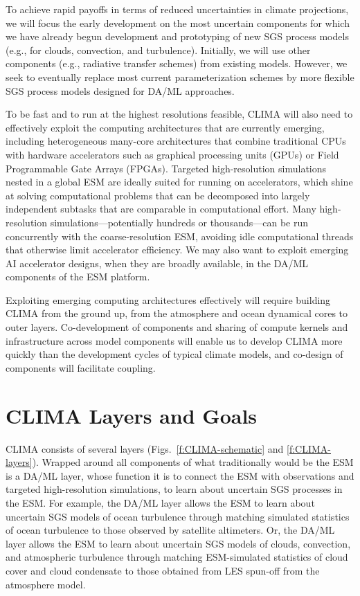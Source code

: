 \documentclass{article}
\begin{document}
To achieve rapid payoffs in terms of reduced uncertainties in climate projections, we will focus the early development on the most uncertain components for which we have already begun development and prototyping of new SGS process models (e.g., for clouds, convection, and turbulence). Initially, we will use other components (e.g., radiative transfer schemes) from existing models. However, we seek to eventually replace most current parameterization schemes by more flexible SGS process models designed for DA/ML approaches. 

To be fast and to run at the highest resolutions feasible, CLIMA will also need to effectively exploit the computing architectures that are currently emerging, including heterogeneous many-core architectures that combine traditional CPUs with hardware accelerators such as graphical processing units (GPUs) or Field Programmable Gate Arrays (FPGAs). Targeted high-resolution simulations nested in a global ESM are ideally suited for running on accelerators, which shine at solving computational problems that can be decomposed into largely independent subtasks that are comparable in computational effort. Many high-resolution simulations---potentially hundreds or thousands---can be run concurrently with the coarse-resolution ESM, avoiding idle computational threads that otherwise limit accelerator efficiency. We may also want to exploit emerging AI accelerator designs, when they are broadly available, in the DA/ML components of the ESM platform. 

Exploiting emerging computing architectures effectively will require building CLIMA from the ground up, from the atmosphere and ocean dynamical cores to outer layers. Co-development of components and sharing of compute kernels and infrastructure across model components will enable us to develop CLIMA more quickly than the development cycles of typical climate models, and co-design of components will facilitate coupling.

\section{CLIMA Layers and Goals}

CLIMA consists of several layers (Figs.~\ref{f:CLIMA-schematic} and \ref{f:CLIMA-layers}). Wrapped around all components of what traditionally would be the ESM is a DA/ML layer, whose function it is to connect the ESM with observations and targeted high-resolution simulations, to learn about uncertain SGS processes in the ESM. For example, the DA/ML layer allows the ESM to learn about uncertain SGS models of ocean turbulence through matching simulated statistics of ocean turbulence to those observed by satellite altimeters. Or, the DA/ML layer allows the ESM to learn about uncertain SGS models of clouds, convection, and atmospheric turbulence through matching ESM-simulated statistics of cloud cover and cloud condensate to those obtained from LES spun-off from the atmosphere model. 
\end{document}
